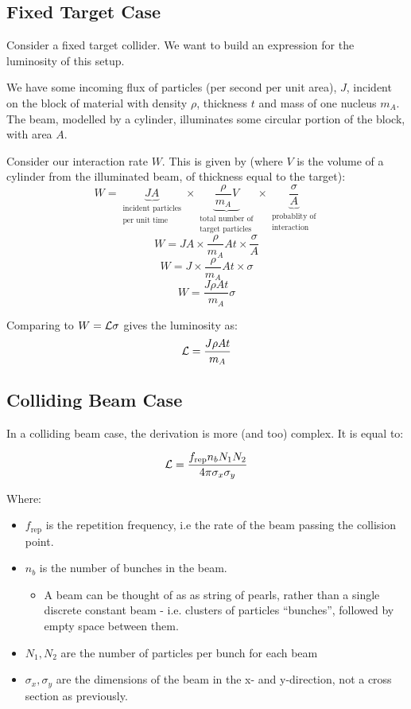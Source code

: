 \subsection{Fixed Target Case}

Consider a fixed target collider. We want to build an expression for the luminosity of this setup.

We have some incoming flux of particles (per second per unit area), $J$, incident on the block of material with density $\rho$, thickness $t$ and mass of one nucleus $m_A$. The beam, modelled by a cylinder, illuminates some circular portion of the block, with area $A$.

Consider our interaction rate $W$. This is given by (where $V$ is the volume of a cylinder from the illuminated beam, of thickness equal to the target):
\[
    W = \underbrace{J A}_{\substack{\text{incident particles} \\ \text{per unit time}}} \times \underbrace{\frac{\rho}{m_A} V}_{\substack{\text{total number of} \\ \text{target particles}}} \times \underbrace{\frac{\sigma}{A}}_{\substack{\text{probablity of} \\ \text{interaction}}}
\]
\[
W = {J A} \times \frac{\rho}{m_A} At \times \frac{\sigma}{A}
\]
\[
    W = {J} \times \frac{\rho}{m_A} At \times \sigma
\]
\[
    W = \frac{J \rho A t}{m_A} \sigma
\]

Comparing to $W = \mathcal{L} \sigma$ gives the luminosity as:
\[
    \mathcal{L} = \frac{J \rho At}{m_A}
\]

\subsection{Colliding Beam Case}
In a colliding beam case, the derivation is more (and too) complex. It is equal to:

\[
    \mathcal{L} = \frac{f_\text{rep} n_b N_1 N_2}{4 \pi \sigma_x \sigma_y}
\]

Where:
\begin{itemize}
    \item $f_\text{rep}$ is the repetition frequency, i.e the rate of the beam passing the collision point.
    \item $n_b$ is the number of bunches in the beam.
    \begin{itemize}
        \item A beam can be thought of as as string of pearls, rather than a single discrete constant beam - i.e. clusters of particles ``bunches'', followed by empty space between them.
    \end{itemize}
    \item $N_1, N_2$ are the number of particles per bunch for each beam
    \item $\sigma_x, \sigma_y$ are the dimensions of the beam in the x- and y-direction, not a cross section as previously.
\end{itemize}

